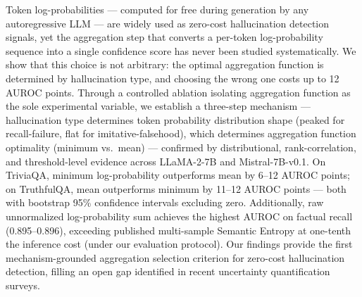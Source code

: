 Token log-probabilities --- computed for free during generation by any autoregressive LLM --- are widely used as zero-cost hallucination detection signals, yet the aggregation step that converts a per-token log-probability sequence into a single confidence score has never been studied systematically. We show that this choice is not arbitrary: the optimal aggregation function is determined by hallucination type, and choosing the wrong one costs up to 12 AUROC points. Through a controlled ablation isolating aggregation function as the sole experimental variable, we establish a three-step mechanism --- hallucination type determines token probability distribution shape (peaked for recall-failure, flat for imitative-falsehood), which determines aggregation function optimality (minimum vs.\ mean) --- confirmed by distributional, rank-correlation, and threshold-level evidence across LLaMA-2-7B and Mistral-7B-v0.1. On TriviaQA, minimum log-probability outperforms mean by 6--12 AUROC points; on TruthfulQA, mean outperforms minimum by 11--12 AUROC points --- both with bootstrap 95\% confidence intervals excluding zero. Additionally, raw unnormalized log-probability sum achieves the highest AUROC on factual recall (0.895--0.896), exceeding published multi-sample Semantic Entropy at one-tenth the inference cost (under our evaluation protocol). Our findings provide the first mechanism-grounded aggregation selection criterion for zero-cost hallucination detection, filling an open gap identified in recent uncertainty quantification surveys.
